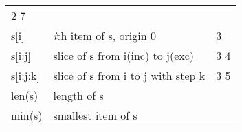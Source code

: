 \documentclass[11pt]{article}
\begin{document}
\begin{longtable}[]{@{}lll@{}}
\begin{minipage}[t]{0.14\columnwidth}
2 7\strut
\end{minipage}\tabularnewline
\begin{minipage}[t]{0.14\columnwidth}\raggedright\strut
s{[}i{]}\strut
\end{minipage} & \begin{minipage}[t]{0.14\columnwidth}\raggedright\strut
\emph{i}th item of s, origin 0\strut
\end{minipage} & \begin{minipage}[t]{0.14\columnwidth}\raggedright\strut
3\strut
\end{minipage}\tabularnewline
\begin{minipage}[t]{0.14\columnwidth}\raggedright\strut
s{[}i:j{]}\strut
\end{minipage} & \begin{minipage}[t]{0.14\columnwidth}\raggedright\strut
slice of s from i(inc) to j(exc)\strut
\end{minipage} & \begin{minipage}[t]{0.14\columnwidth}\raggedright\strut
3 4\strut
\end{minipage}\tabularnewline
\begin{minipage}[t]{0.14\columnwidth}\raggedright\strut
s{[}i:j:k{]}\strut
\end{minipage} & \begin{minipage}[t]{0.14\columnwidth}\raggedright\strut
slice of s from i to j with step k\strut
\end{minipage} & \begin{minipage}[t]{0.14\columnwidth}\raggedright\strut
3 5\strut
\end{minipage}\tabularnewline
\begin{minipage}[t]{0.14\columnwidth}\raggedright\strut
len(s)\strut
\end{minipage} & \begin{minipage}[t]{0.14\columnwidth}\raggedright\strut
length of s\strut
\end{minipage} & \begin{minipage}[t]{0.14\columnwidth}\raggedright\strut
\strut
\end{minipage}\tabularnewline
\begin{minipage}[t]{0.14\columnwidth}\raggedright\strut
min(s)\strut
\end{minipage} & \begin{minipage}[t]{0.14\columnwidth}\raggedright\strut
smallest item of s\strut
\end{minipage} & \begin{minipage}[t]{0.14\columnwidth}\raggedright\strut

\end{minipage}
\end{longtable}
\end{document}
